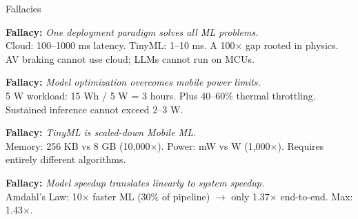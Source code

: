 \documentclass[aspectratio=169, 12pt]{beamer}
\begin{document}
\begin{frame}{Fallacies}
\note{
%
%
}

\footnotesize
\textbf{Fallacy:} \textit{One deployment paradigm solves all ML problems.}\\
Cloud: 100--1000 ms latency. TinyML: 1--10 ms. A 100$\times$ gap rooted in physics. AV braking cannot use cloud; LLMs cannot run on MCUs.

\vspace{0.1cm}
\textbf{Fallacy:} \textit{Model optimization overcomes mobile power limits.}\\
5 W workload: 15 Wh / 5 W = 3 hours. Plus 40--60\% thermal throttling. Sustained inference cannot exceed 2--3 W.

\vspace{0.1cm}
\textbf{Fallacy:} \textit{TinyML is scaled-down Mobile ML.}\\
Memory: 256 KB vs 8 GB (10,000$\times$). Power: mW vs W (1,000$\times$). Requires entirely different algorithms.

\vspace{0.1cm}
\textbf{Fallacy:} \textit{Model speedup translates linearly to system speedup.}\\
Amdahl's Law: 10$\times$ faster ML (30\% of pipeline) $\to$ only 1.37$\times$ end-to-end. Max: 1.43$\times$.

\end{frame}
\end{document}
